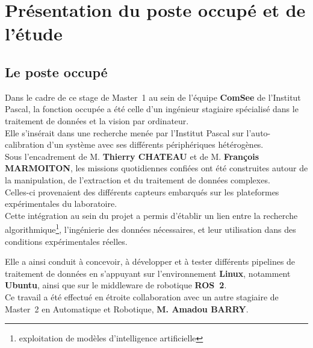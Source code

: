\documentclass[12pt,a4paper,oneside]{report}
\begin{document}
\chapter{Présentation du poste occupé et de l'étude}

\section{Le poste occupé}

Dans le cadre de ce stage de Master~1 au sein de l'équipe \textbf{ComSee} de l'Institut Pascal, la fonction occupée a été celle d'un ingénieur stagiaire spécialisé dans le traitement de données et la vision par ordinateur.\\

\hspace*{.5cm}Elle s'insérait dans une recherche menée par l'Institut Pascal sur l'auto-calibration d'un système avec ses différents périphériques hétérogènes.\\

Sous l'encadrement de M. \textbf{Thierry CHATEAU} et de M. \textbf{François MARMOITON}, les missions quotidiennes confiées ont été construites autour de la manipulation, de l'extraction et du traitement de données complexes. \\

\hspace*{.5cm}Celles-ci provenaient des différents capteurs embarqués sur les plateformes expérimentales du laboratoire.\\

Cette intégration au sein du projet a permis d'établir un lien entre la recherche algorithmique\footnote{exploitation de modèles d'intelligence artificielle}, l'ingénierie des données nécessaires, et leur utilisation dans des conditions expérimentales réelles.\vspace{0.05cm}

\hspace*{.5cm}Elle a ainsi conduit à concevoir, à développer et à tester différents pipelines de traitement de données en s'appuyant sur l'environnement \textbf{Linux}, notamment \textbf{Ubuntu}, ainsi que sur le middleware de robotique \textbf{ROS~2}.\\

Ce travail a été effectué en étroite collaboration avec un autre stagiaire de Master~2 en Automatique et Robotique, \textbf{M. Amadou BARRY}. \vspace{0.1cm}
\end{document}
